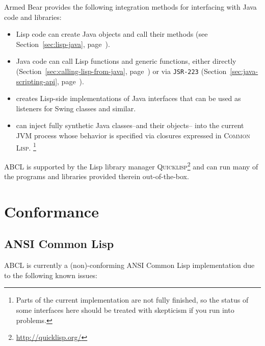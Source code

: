 \documentclass[10pt]{book}
\begin{document}
Armed Bear provides the following integration methods for interfacing
with Java code and libraries:
\begin{itemize}
\item Lisp code can create Java objects and call their methods (see
  Section~\ref{sec:lisp-java}, page~\pageref{sec:lisp-java}).
\item Java code can call Lisp functions and generic functions, either
  directly (Section~\ref{sec:calling-lisp-from-java},
  page~\pageref{sec:calling-lisp-from-java}) or via \texttt{JSR-223}
  (Section~\ref{sec:java-scripting-api},
  page~\pageref{sec:java-scripting-api}).
\item {} creates Lisp-side implementations
  of Java interfaces that can be used as listeners for Swing classes and
  similar.
\item {} can inject fully synthetic Java
  classes--and their objects-- into the current JVM process whose
  behavior is specified via closures expressed in \textsc{Common
    Lisp}. \footnote{Parts of the current implementation are not fully
    finished, so the status of some interfaces here should be treated
    with skepticism if you run into problems.}

\end{itemize}
\textsc{ABCL} is supported by the Lisp library manager
\textsc{Quicklisp}\footnote{\url{http://quicklisp.org/}} and can run many of the
programs and libraries provided therein out-of-the-box.

\section{Conformance}
\label{section:conformance}

\subsection{ANSI Common Lisp}
\textsc{ABCL} is currently a (non)-conforming \textsc{ANSI} Common Lisp
implementation due to the following known issues:
\end{document}
